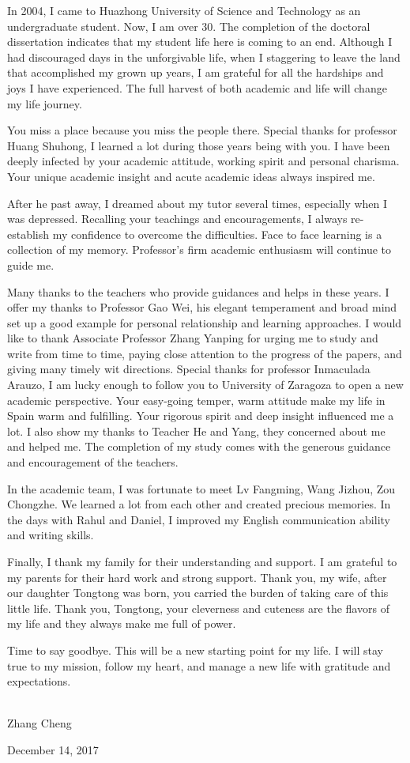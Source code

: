 \backmatter
\begin{ack}

In 2004, I came to Huazhong University of Science and Technology as an undergraduate student. Now, I am over 30. The completion of the doctoral dissertation indicates that my student life here is coming to an end. Although I had discouraged days in the unforgivable life, when I staggering to leave the land that accomplished my grown up years, I am grateful for all the hardships and joys I have experienced.
The full harvest of both academic and life will change my life journey.

You miss a place because you miss the people there. Special thanks for professor Huang Shuhong, I learned a lot during those years being with you. I have been deeply infected by your academic attitude, working spirit and personal charisma. Your unique academic insight and acute academic ideas always inspired me. 

After he past away, I dreamed about my tutor several times, especially when I was depressed. Recalling your teachings and encouragements, I always re-establish my confidence to overcome the difficulties. Face to face learning is a collection of my memory. Professor’s firm academic enthusiasm will continue to guide me.

Many thanks to the teachers who provide guidances and helps in these years. I offer my thanks to Professor Gao Wei, his elegant temperament and broad mind set up a good example for personal relationship and learning approaches.
I would like to thank Associate Professor Zhang Yanping for urging me to study and write from time to time, paying close attention to the progress of the papers, and giving many timely wit directions.
Special thanks for professor Inmaculada Arauzo, I am lucky enough to follow you to University of Zaragoza to open a new academic perspective. Your easy-going temper, warm attitude make my life in Spain warm and fulfilling. Your rigorous spirit and deep insight influenced me a lot. I also show my thanks to Teacher He and Yang, they concerned about me and helped me. The completion of my study comes with the generous guidance and encouragement of the teachers.

In the academic team, I was fortunate to meet Lv Fangming, Wang Jizhou, Zou Chongzhe. We learned a lot from each other and created precious memories. In the days with Rahul and Daniel, I improved my English communication ability and writing skills.

Finally, I thank my family for their understanding and support. I am grateful to my parents for their hard work and strong support. Thank you, my wife, after our daughter Tongtong was born, you carried the burden of taking care of this little life. Thank you, Tongtong, your cleverness and cuteness are the flavors of my life and they always make me full of power.

Time to say goodbye. This will be a new starting point for my life. I will stay true to my mission, follow my heart, and manage a new life with gratitude and expectations.
\\
\\


\begin{flushright}
	Zhang Cheng
	
	December 14, 2017
\end{flushright}

\end{ack}
